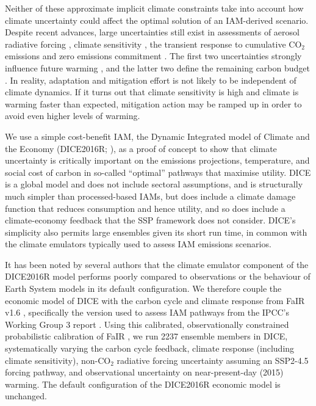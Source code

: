 \documentclass{article}
\begin{document}
Neither of these approximate implicit climate constraints take into account how climate uncertainty could affect the optimal solution of an IAM-derived scenario. Despite recent advances, large uncertainties still exist in assessments of aerosol radiative forcing \citep{Bellouin2020}, climate sensitivity \citep{Sherwood2020}, the transient response to cumulative CO$_2$ emissions \citep{Canadell2021} and zero emissions commitment \citep{Lee2021}. The first two uncertainties strongly influence future warming \citep{Smith2019}, and the latter two define the remaining carbon budget \citep{Rogelj2019}. In reality, adaptation and mitigation effort is not likely to be independent of climate dynamics. If it turns out that climate sensitivity is high and climate is warming faster than expected, mitigation action may be ramped up in order to avoid even higher levels of warming.

We use a simple cost-benefit IAM, the Dynamic Integrated model of Climate and the Economy (DICE2016R; \citet{Nordhaus2017,Nordhaus2018}), as a proof of concept to show that climate uncertainty is critically important on the emissions projections, temperature, and social cost of carbon in so-called ``optimal'' pathways that maximise utility. DICE is a global model and does not include sectoral assumptions, and is structurally much simpler than processed-based IAMs, but does include a climate damage function that reduces consumption and hence utility, and so does include a climate-economy feedback that the SSP framework does not consider. DICE's simplicity also permits large ensembles given its short run time, in common with the climate emulators typically used to assess IAM emissions scenarios.

It has been noted by several authors \citep{Folini2021,Dietz2021,Gasser2021} that the climate emulator component of the DICE2016R model performs poorly compared to observations or the behaviour of Earth System models in its default configuration. We therefore couple the economic model of DICE with the carbon cycle and climate response from FaIR v1.6 \citep{Smith2018}, specifically the version used to assess IAM pathways from the IPCC's Working Group 3 report \citep{Riahi2022,Kikstra2022,Byers2022,IPCC2022WG3}. Using this calibrated, observationally constrained probabilistic calibration of FaIR \citep{Smith2021}, we run 2237 ensemble members in DICE, systematically varying the carbon cycle feedback, climate response (including climate sensitivity), non-CO$_2$ radiative forcing uncertainty assuming an SSP2-4.5 forcing pathway, and observational uncertainty on near-present-day (2015) warming. The default configuration of the DICE2016R economic model is unchanged.
\end{document}
